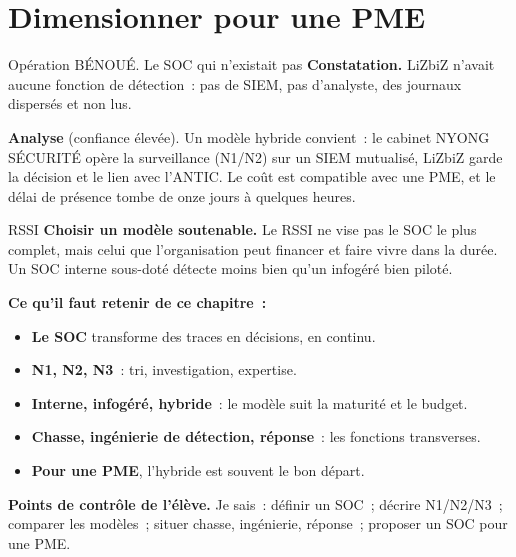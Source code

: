 \section{Dimensionner pour une PME}
\label{sec:c02-pme}

\begin{boxscenario}{Opération BÉNOUÉ. Le SOC qui n'existait pas}
\textbf{Constatation.} LiZbiZ n'avait aucune fonction de détection~: pas de
SIEM, pas d'analyste, des journaux dispersés et non lus.

\medskip
\textbf{Analyse} (confiance élevée). Un modèle hybride convient~: le cabinet
NYONG SÉCURITÉ opère la surveillance (N1/N2) sur un SIEM mutualisé, LiZbiZ
garde la décision et le lien avec l'ANTIC. Le coût est compatible avec une
PME, et le délai de présence tombe de onze jours à quelques heures.
\end{boxscenario}

\begin{boxmetier}{RSSI}
\textbf{Choisir un modèle soutenable.} Le RSSI ne vise pas le SOC le plus
complet, mais celui que l'organisation peut financer et faire vivre dans la
durée. Un SOC interne sous-doté détecte moins bien qu'un infogéré bien piloté.
\end{boxmetier}

\separateur

\begin{boxresume}
\textbf{Ce qu'il faut retenir de ce chapitre~:}
\begin{itemize}
    \item \textbf{Le SOC} transforme des traces en décisions, en continu.
    \item \textbf{N1, N2, N3}~: tri, investigation, expertise.
    \item \textbf{Interne, infogéré, hybride}~: le modèle suit la maturité et
          le budget.
    \item \textbf{Chasse, ingénierie de détection, réponse}~: les fonctions
          transverses.
    \item \textbf{Pour une PME}, l'hybride est souvent le bon départ.
\end{itemize}
\end{boxresume}

\begin{boxinfo}
\textbf{Points de contrôle de l'élève.} Je sais~: définir un SOC~; décrire
N1/N2/N3~; comparer les modèles~; situer chasse, ingénierie, réponse~;
proposer un SOC pour une PME.
\end{boxinfo}

